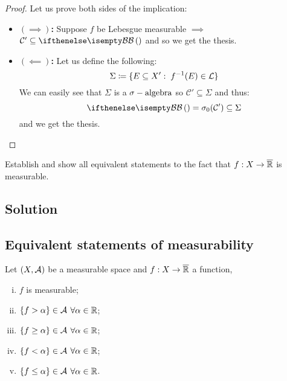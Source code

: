 \begin{proof}
    Let us prove both sides of the implication:
    \begin{itemize}
        \item \textbf{$(\implies)$:} Suppose $f$ be Lebesgue measurable $\implies$ $\mathcal{C}'\subseteq \B$ and so we get the thesis.
        \item \textbf{$(\impliedby)$:} Let us define the following:
              \[
                  \Sigma \coloneqq \{ E\subseteq X': \; f^{-1}(E)\in\mathcal{L} \}
              \]
              We can easily see that $\Sigma$ is a $\sigma-\text{algebra}$ so $\mathcal{C}'\subseteq \Sigma$ and thus:
              \[
                  \B=\sigma_0(\mathcal{C}')\subseteq\Sigma
              \]
              and we get the thesis.
    \end{itemize}
\end{proof}


\question

Establish and show all equivalent statements to the fact that $f : X \to \overline{\mathbb{R}}$ is measurable.

\subsection*{Solution}

\subsection{Equivalent statements of measurability}
Let $(X,\mathcal{A})$ be a measurable space and $f:X\to\overline{\mathbb{R}}$ a function, \tfae

\begin{enumerate}[i)]
    \item \label{statomeas:1} $f$ is measurable;
    \item \label{statomeas:2} $\{ f>\alpha \}\in\mathcal{A}$ $\forall\alpha\in\mathbb{R}$;
    \item \label{statomeas:3} $\{ f\geq\alpha \}\in\mathcal{A}$ $\forall\alpha\in\mathbb{R}$;
    \item \label{statomeas:4} $\{ f<\alpha \}\in\mathcal{A}$ $\forall\alpha\in\mathbb{R}$;
    \item \label{statomeas:5} $\{ f\leq\alpha \}\in\mathcal{A}$ $\forall\alpha\in\mathbb{R}$.
\end{enumerate}

